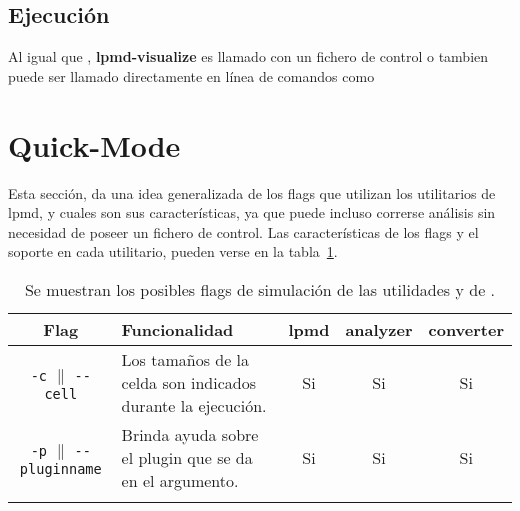 \subsection{Ejecuci\'on}

Al igual que \lpmd, \textbf{lpmd-visualize} es llamado con un fichero de control o tambien puede ser llamado directamente en l\'inea de comandos como

%

\section{Quick-Mode}
\label{chap:util-quickmode}

Esta secci\'on, da una idea generalizada de los flags que utilizan los utilitarios de lpmd, y cuales son sus caracter\'isticas, ya que puede incluso correrse an\'alisis sin necesidad de poseer un fichero de control. Las caracter\'isticas de los flags y el soporte en cada utilitario, pueden verse en la tabla~\ref{tab:quickmode}.

\begin{table}[h!]
 \centering
 \begin{tabular}{cp{5cm}ccc}\\
 \hline\hline
  Flag & Funcionalidad & lpmd & analyzer & converter \\
 \hline\hline
\verb|-c| $\parallel$ \verb|--cell|&Los tama\~nos de la celda son indicados durante la ejecuci\'on.&Si&Si&Si\\\hline
\verb|-p| $\parallel$ \verb|--pluginname|&Brinda ayuda sobre el plugin que se da en el argumento.&Si&Si&Si\\\hline
 &&&&\\\hline
 \end{tabular}
 \label{tab:quickmode}
 \caption{Se muestran los posibles flags de simulaci\'on de las utilidades y de \lpmd.}
\end{table}
